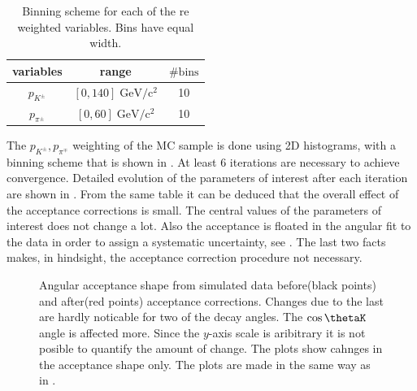 \begin{table}[!h]
  \center
  \begin{tabular}{c c c}
    \hline
     variables & range & $\# \text{bins}$ \\
    \hline
    $p_{K^{\pm}}$    &  $[0,140]    \;  \text{GeV}/\text{c}^2$  & 10      \\
    $p_{\pi^{\pm}}$  &  $[0,60]      \;  \text{GeV}/\text{c}^2$  & 10      \\
    \hline
  \end{tabular}
  \caption{\small Binning scheme for each of the re weighted variables. Bins have equal width.}
  \label{angAccBinning}
\end{table}

The $p_{K^{\pm}},p_{\pi^{\mp}}$ weighting of the MC sample is done using 2D histograms, with a binning scheme that is shown in .
At least 6 iterations are necessary to achieve convergence. Detailed evolution of the parameters of interest after each iteration are shown in
. From the same table it can be deduced that the overall effect of the acceptance corrections is small. The central
values of the parameters of interest does not change a lot. Also the acceptance is floated in the angular fit to the data in order to assign
a systematic uncertainty, see . The last two facts makes, in hindsight, the acceptance correction procedure not necessary.

\begin{figure}[h]
  \centering
  \begin{subfigure}{0.49\textwidth}
    \scalebox{1.3}{}
    \caption{}
    \label{angAccCor_ctk}
  \end{subfigure}%
  \hfill%
  \begin{subfigure}{0.49\textwidth}
    \scalebox{1.3}{}
    \caption{}
    \label{angAccCorr_ctl}
  \end{subfigure}
  \vspace*{0.02\textwidth}
  \begin{subfigure}{0.49\textwidth}
    \scalebox{1.3}{}
    \caption{}
    \label{angAccCorr_phi}
  \end{subfigure}
  \caption{Angular acceptance shape from simulated data before(black points) and after(red points) acceptance corrections.
           Changes due to the last are hardly noticable for two of the decay angles. The $\cos\thetaK$ angle is affected more.
           Since the $y$-axis scale is aribitrary it is not posible to quantify the amount of change. The plots show cahnges
           in the acceptance shape only. The plots are made in the same way as in .}
  \label{angAggCorrections}
\end{figure}



